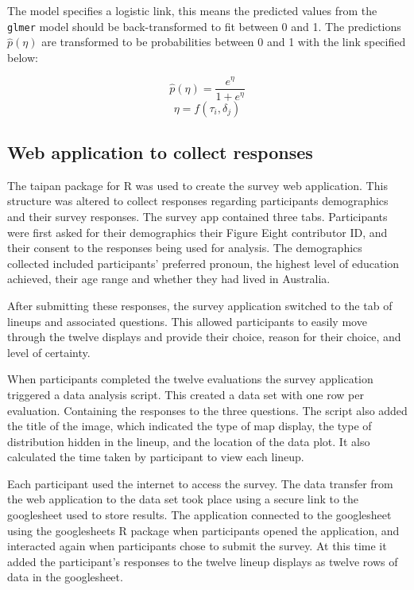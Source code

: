 \documentclass{monashthesis}
\begin{document}
The model specifies a logistic link, this means the predicted values from the \texttt{glmer} model should be back-transformed to fit between 0 and 1. The predictions \(\widehat{p}(\eta)\) are transformed to be probabilities between 0 and 1 with the link specified below:

\[\widehat{p}(\eta) = \frac{e^{\eta}}{1 + e^{\eta}}\] \label{eq:transform}
\[\eta = f(\tau_i,\delta_j)\]

\hypertarget{web-application-to-collect-responses}{%
\subsection{Web application to collect responses}\label{web-application-to-collect-responses}}

The taipan \autocite{taipan} package for R was used to create the survey web application.
This structure was altered to collect responses regarding participants demographics and their survey responses.
The survey app contained three tabs. Participants were first asked for their demographics their Figure Eight contributor ID, and their consent to the responses being used for analysis. The demographics collected included participants' preferred pronoun, the highest level of education achieved, their age range and whether they had lived in Australia.

After submitting these responses, the survey application switched to the tab of lineups and associated questions. This allowed participants to easily move through the twelve displays and provide their choice, reason for their choice, and level of certainty.

When participants completed the twelve evaluations the survey application triggered a data analysis script. This created a data set with one row per evaluation. Containing the responses to the three questions. The script also added the title of the image, which indicated the type of map display, the type of distribution hidden in the lineup, and the location of the data plot. It also calculated the time taken by participant to view each lineup.

Each participant used the internet to access the survey.
The data transfer from the web application to the data set took place using a secure link to the googlesheet used to store results. The application connected to the googlesheet using the googlesheets \autocite{sheets} R package when participants opened the application, and interacted again when participants chose to submit the survey. At this time it added the participant's responses to the twelve lineup displays as twelve rows of data in the googlesheet.
\end{document}
